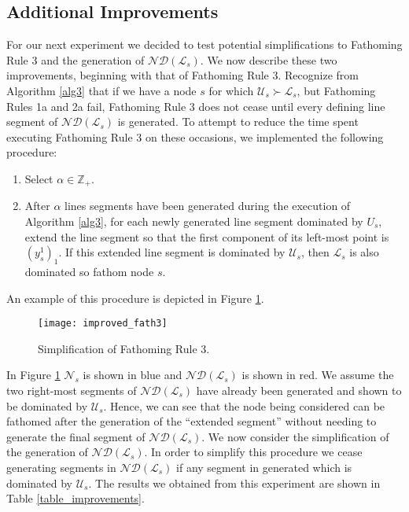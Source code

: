\documentclass[11.5pt]{article}
\newcommand{\Z}{\mathbb{Z}}
\newcommand{\dom}{\succ}
\newcommand{\U}{\mathcal{U}}
\renewcommand{\L}{\mathcal{L}}
\newcommand{\N}{\mathcal{N}}
\newcommand{\OS}{\mathcal{OS}}
\newcommand{\nd}[1]{\mathcal{ND}(#1)}
\begin{document}
\subsection{Additional Improvements}

For our next experiment we decided to test potential simplifications to Fathoming Rule 3 and the generation of $\nd{\L_s}$. We now describe these two improvements, beginning with that of Fathoming Rule 3. Recognize from Algorithm \ref{alg3} that if we have a node $s$ for which $\U_s \dom \L_s$, but Fathoming Rules 1a and 2a fail, Fathoming Rule 3 does not cease until every defining line segment of $\nd{\L_s}$ is generated. To attempt to reduce the time spent executing Fathoming Rule 3 on these occasions, we implemented the following procedure:
\begin{enumerate}
\item Select $\alpha \in \Z_+$.
\item After $\alpha$ lines segments have been generated during the execution of Algorithm \ref{alg3}, for each newly generated line segment dominated by $U_s$, extend the line segment so that the first component of its left-most point is $(y^1_s)_1$. If this extended line segment is dominated by $\U_s$, then $\L_s$ is also dominated so fathom node $s$.
\end{enumerate}
An example of this procedure is depicted in Figure \ref{fig_improved_fath3}.
\begin{figure}
\centering
\texttt{[image: improved\_fath3]}
\caption{Simplification of Fathoming Rule 3.}
\label{fig_improved_fath3}
\end{figure}
In Figure \ref{fig_improved_fath3} $\N_s$ is shown in blue and $\nd{\L_s}$ is shown in red. We assume the two right-most segments of $\nd{\L_s}$ have already been generated and shown to be dominated by $\U_s$. Hence, we can see that the node being considered can be fathomed after the generation of the ``extended segment'' without needing to generate the final segment of $\nd{\L_s}$. We now consider the simplification of the generation of $\nd{\L_s}$. In order to simplify this procedure we cease generating segments in $\nd{\L_s}$ if any segment in generated which is dominated by $\U_s$. The results we obtained from this experiment are shown in Table \ref{table_improvements}.
\end{document}
